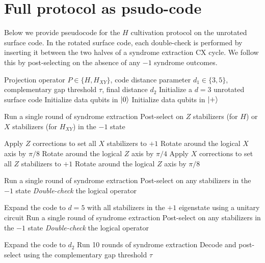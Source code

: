 \documentclass[twocolumn,notitlepage,nofootinbib,floatfix,superscriptaddress]{revtex4-1}
\begin{document}
\section{Full protocol as psudo-code}
\label{SI:psudocode}
Below we provide pseudocode for the $H$ cultivation protocol on the unrotated surface code. In the rotated surface code, each double-check is performed by inserting it between the two halves of a syndrome extraction CX cycle. We follow this by post-selecting on the absence of any $-1$ syndrome outcomes. 
\hfill \break
\begin{algorithm}[H]
\caption{Pseudocode for Cultivation on an Unrotated Surface Code}
\begin{algorithmic}[1]
\Require Projection operator $P \in \{H, H_{XY}\}$, code distance parameter $d_1 \in \{3,5\}$, complementary gap threshold $\tau$, final distance $d_2$
\State Initialize a $d=3$ unrotated surface code
    \State Initialize data qubits in $\ket{0}$
    \State Initialize data qubits in $\ket{+}$
\EndIf

\State Run a single round of syndrome extraction
\State Post-select on $Z$ stabilizers (for $H$) or $X$ stabilizers (for $H_{XY}$) in the $-1$ state

    \State Apply $Z$ corrections to set all $X$ stabilizers to $+1$
    \State Rotate around the logical $X$ axis by $\pi/8$
    \State Rotate around the logical $Z$ axis by $\pi/4$
    \State Apply $X$ corrections to set all $Z$ stabilizers to $+1$
    \State Rotate around the logical $Z$ axis by $\pi/8$
\EndIf

\State Run a single round of syndrome extraction
\State Post-select on any stabilizers in the $-1$ state
\State \textit{Double-check} the logical operator 

    \State Expand the code to $d=5$ with all stabilizers in the $+1$ eigenstate using a unitary circuit
    \State Run a single round of syndrome extraction
    \State Post-select on any stabilizers in the $-1$ state
    \State \textit{Double-check} the logical operator
\EndIf

\State Expand the code to $d_2$ 
\State Run 10 rounds of syndrome extraction
\State Decode and post-select using the complementary gap threshold $\tau$
\end{algorithmic}
\end{algorithm}
\end{document}
